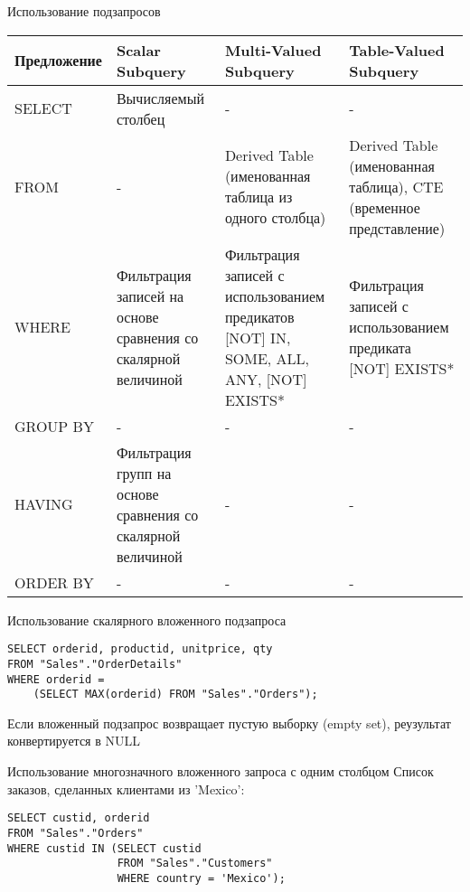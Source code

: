\documentclass[12pt]{article}
\begin{document}
\begin{nota}{Использование подзапросов}
    \begin{center}
        \begin{tabular}{|m{6.5em}|m{8.5em}|m{10em}|m{10em}|}
            \hline 
            Предложение & Scalar Subquery & Multi-Valued Subquery & Table-Valued Subquery \\
            \hline
            SELECT & Вычисляемый столбец & - & - \\
            \hline
            FROM & - & Derived Table (именованная таблица из одного столбца) & Derived Table (именованная таблица), CTE (временное представление) \\
            \hline
            WHERE & Фильтрация записей на основе сравнения со скалярной величиной & Фильтрация записей с использованием предикатов [NOT] IN, SOME, ALL, ANY, [NOT] EXISTS* & Фильтрация записей с использованием предиката [NOT] EXISTS* \\
            \hline
            GROUP BY & - & - & - \\
            \hline
            HAVING & Фильтрация групп на основе сравнения со скалярной величиной & - & - \\
            \hline
            ORDER BY & - & - & - \\
            \hline
        \end{tabular}
    \end{center}
\end{nota}

\begin{Example}{Использование скалярного вложенного подзапроса}
\begin{lstlisting}
SELECT orderid, productid, unitprice, qty
FROM "Sales"."OrderDetails"
WHERE orderid = 
    (SELECT MAX(orderid) FROM "Sales"."Orders");
\end{lstlisting}

    Если вложенный подзапрос возвращает пустую выборку (empty set), реузультат конвертируется в NULL
\end{Example}

\begin{Example}{Использование многозначного вложенного запроса с одним столбцом}
    Список заказов, сделанных клиентами из 'Mexico':
\begin{lstlisting}
SELECT custid, orderid 
FROM "Sales"."Orders"
WHERE custid IN (SELECT custid
                 FROM "Sales"."Customers"
                 WHERE country = 'Mexico');
\end{lstlisting}
\end{Example}
\end{document}
